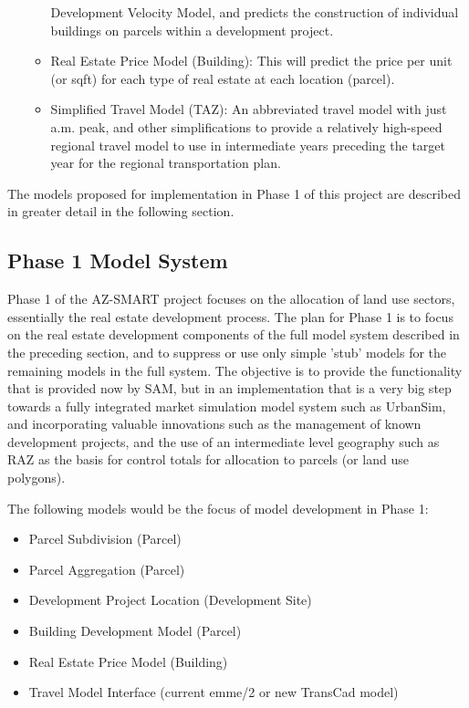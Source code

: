 \begin{itemize}
\begin{itemize}
Development Velocity Model, and predicts the construction of individual
buildings on parcels within a development project.
\item Real Estate Price Model (Building): This will predict the price
per unit (or sqft) for each type of real estate at each location (parcel).
\item Simplified Travel Model (TAZ): An abbreviated travel model with
just a.m. peak, and other simplifications to provide a relatively
high-speed regional travel model to use in intermediate years preceding
the target year for the regional transportation plan.
\end{itemize}
\end{itemize}

The models proposed for implementation in Phase 1 of this project are
described in greater detail in the following section.

\subsection{Phase 1 Model System}
Phase 1 of the AZ-SMART project focuses on the allocation of land use
sectors, essentially the real estate development process.  The plan
for Phase 1 is to focus on the real estate development components of
the full model system described in the preceding section, and to
suppress or use only simple 'stub' models for the remaining models
in the full system.  The objective is to provide the functionality
that is provided now by SAM, but in an implementation that is a
very big step towards a fully integrated market simulation model
system such as UrbanSim, and incorporating valuable innovations
such as the management of known development projects, and the use
of an intermediate level geography such as RAZ as the basis for
control totals for allocation to parcels (or land use polygons).

The following models would be the focus of model development in Phase 1:

\begin{itemize}
\item Parcel Subdivision (Parcel)
\item Parcel Aggregation (Parcel)
\item Development Project Location (Development Site)
\item Building Development Model (Parcel)
\item Real Estate Price Model (Building)
\item Travel Model Interface (current emme/2 or new TransCad model)
\end{itemize}


